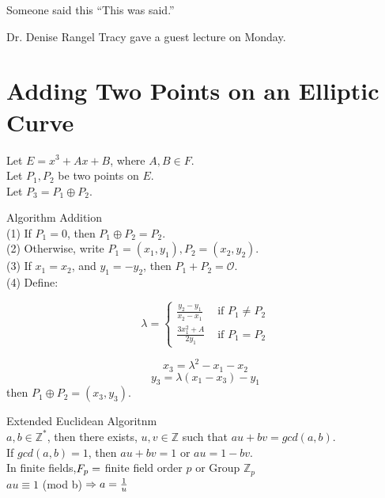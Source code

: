 \begin{chapquote}{Someone said this}
``This was said.''
\end{chapquote}

Dr. Denise Rangel Tracy gave a guest lecture on Monday.

\section{Adding Two Points on an Elliptic Curve}

Let $E=x^3+Ax+B$, where $A, B\in F$.
\\Let $P_{1}, P_{2}$ be two points on $E$. 
\\Let $P_{3}=P_{1} \oplus P_{2}$.

Algorithm Addition
\\(1) If $P_{1}=0$, then $P_{1} \oplus P_{2} = P_{2}$.
\\(2) Otherwise, write $P_{1}=(x_{1}, y_{1}), P_{2}=(x_{2}, y_{2})$.
\\(3) If $x_{1}=x_{2}$, and $y_{1}=-y_{2}$, then $P_{1}+P_{2}=\mathcal{O}$.
\\(4) Define:

$$ \lambda =\begin{cases} \frac{y_{2}-y_{1}}{x_{2}-x_{1}} & \text{ if } P_{1}\neq P_{2} \\ \frac{3x_{1}^2+A}{2y_{1}} & \text{ if } P_{1}=P_{2} \end{cases}$$

$$x_{3} = \lambda ^2 - x_{1} - x_{2}$$
$$y_{3}=\lambda(x_{1}-x_{3})-y_{1}$$
then $P_{1} \oplus P_{2} = (x_{3},y_{3})$.

Extended Euclidean Algoritnm 
\\$a,b \in \mathbb{Z}^{*}$, then there exists, $u,v \in \mathbb{Z}$ such that $au+bv=gcd(a,b)$. \\If $gcd(a,b)=1$, then $au+bv=1$ or $au=1-bv$. 
\\In finite fields,$\\
F_p=$ finite field order $p$ or Group $\mathbb{Z}_p$
\\$au \equiv 1$ (mod b)$\\
\Rightarrow a= \frac{1}{u}$\\


